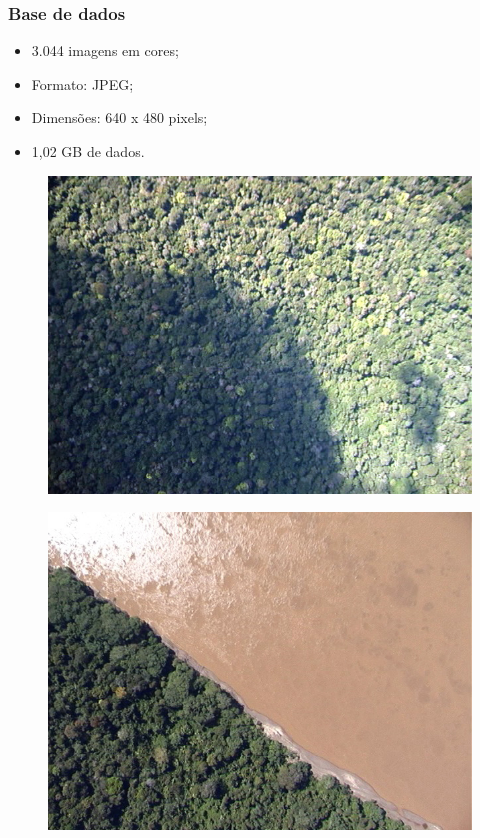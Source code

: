 \documentclass[t]{beamer}
\begin{document}
\begin{frame}
	\frametitle{Base de dados}

	\begin{itemize}
		\item 3.044 imagens em cores;
		\item Formato: JPEG;
		\item Dimensões: 640 x 480 pixels;
		\item 1,02 GB de dados.
	\end{itemize}

	\begin{multicols}{3}
		\begin{figure}
			\includegraphics[scale=0.3]{imgs/amostra1}
		\end{figure}
		\begin{figure}
			\includegraphics[scale=0.3]{imgs/amostra2}

\end{figure}
\end{multicols}
\end{frame}
\end{document}
